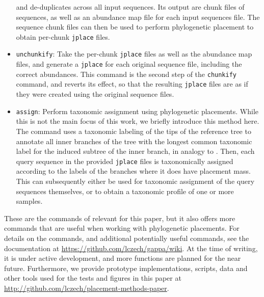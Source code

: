 \begin{itemize}
          and de-duplicates across all input sequences.
          Its output are chunk files of sequences, as well as an abundance map file for each input sequences file.
          The sequence chunk files can then be used to perform phylogenetic placement
          to obtain per-chunk \texttt{jplace} files.
    \item \texttt{unchunkify}: Take the per-chunk \texttt{jplace} files as well as the abundance map files,
          and generate a \texttt{jplace} for each original sequence file, including the correct abundances.
          This command is the second step of the \texttt{chunkify} command, and reverts its effect,
          so that the resulting \texttt{jplace} files are as if they were created using the original sequence files.
    \item \texttt{assign}: Perform taxonomic assignment using phylogenetic placements.
          While this is not the main focus of this work, we briefly introduce this method here.
          The command uses a taxonomic labeling of the tips of the reference tree
          to annotate all inner branches of the tree with the longest common taxonomic label
          for the induced subtree of the inner branch, in analogy to  \citep{Kozlov2016}.
          Then, each query sequence in the provided \texttt{jplace} files
          is taxonomically assigned according to the labels of the branches where it does have placement mass.
          This can subsequently either be used for taxonomic assignment of the query sequences themselves,
          or to obtain a taxonomic profile of one or more samples.
\end{itemize}

These are the commands of  relevant for this paper,
but it also offers more commands that are useful when working with phylogenetic placements.
For details on the commands, and additional potentially useful commands,
see the  documentation at \url{https://github.com/lczech/gappa/wiki}.
At the time of writing, it is under active development, and more functions are planned for the near future.
Furthermore, we provide prototype implementations, scripts, data and other tools
used for the tests and figures in this paper at \url{http://github.com/lczech/placement-methods-paper}.


